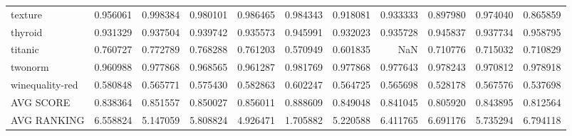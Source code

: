 \begin{tabular}{lrrrrrrrrrr}
texture         &   0.956061 &  0.998384 &  0.980101 &  0.986465 &  0.984343 &  0.918081 &  0.933333 &  0.897980 &  0.974040 &  0.865859 \\
thyroid         &   0.931329 &  0.937504 &  0.939742 &  0.935573 &  0.945991 &  0.932023 &  0.935728 &  0.945837 &  0.937734 &  0.958795 \\
titanic         &   0.760727 &  0.772789 &  0.768288 &  0.761203 &  0.570949 &  0.601835 &       NaN &  0.710776 &  0.715032 &  0.710829 \\
twonorm         &   0.960988 &  0.977868 &  0.968565 &  0.961287 &  0.981769 &  0.977868 &  0.977643 &  0.978243 &  0.970812 &  0.978918 \\
winequality-red &   0.580848 &  0.565771 &  0.575430 &  0.582863 &  0.602247 &  0.564725 &  0.565698 &  0.528178 &  0.567576 &  0.537698 \\
AVG SCORE       &   0.838364 &  0.851557 &  0.850027 &  0.856011 &  0.888609 &  0.849048 &  0.841045 &  0.805920 &  0.843895 &  0.812564 \\
AVG RANKING     &   6.558824 &  5.147059 &  5.808824 &  4.926471 &  1.705882 &  5.220588 &  6.411765 &  6.691176 &  5.735294 &  6.794118 \\
\bottomrule
\end{tabular}
